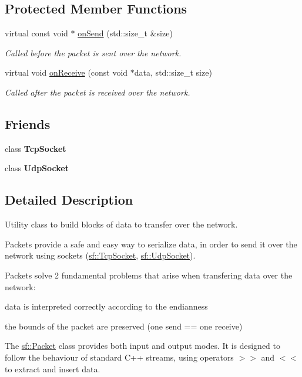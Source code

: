 \subsection*{Protected Member Functions}
\begin{DoxyCompactItemize}
\item 
virtual const void $\ast$ \hyperlink{classsf_1_1Packet_a052e955906c9bfd671622cb625380edc}{on\-Send} (std\-::size\-\_\-t \&size)
\begin{DoxyCompactList}\small\item\em Called before the packet is sent over the network. \end{DoxyCompactList}\item 
virtual void \hyperlink{classsf_1_1Packet_ab71a31ef0f1d5d856de6f9fc75434128}{on\-Receive} (const void $\ast$data, std\-::size\-\_\-t size)
\begin{DoxyCompactList}\small\item\em Called after the packet is received over the network. \end{DoxyCompactList}\end{DoxyCompactItemize}
\subsection*{Friends}
\begin{DoxyCompactItemize}
\item 
\hypertarget{classsf_1_1Packet_aa8b32310b01d4bb702d6bcb969d5f130}{class {\bfseries Tcp\-Socket}}\label{classsf_1_1Packet_aa8b32310b01d4bb702d6bcb969d5f130}

\item 
\hypertarget{classsf_1_1Packet_ae128c6687ced82c6157c5f865f8dec5c}{class {\bfseries Udp\-Socket}}\label{classsf_1_1Packet_ae128c6687ced82c6157c5f865f8dec5c}

\end{DoxyCompactItemize}


\subsection{Detailed Description}
Utility class to build blocks of data to transfer over the network. 

Packets provide a safe and easy way to serialize data, in order to send it over the network using sockets (\hyperlink{classsf_1_1TcpSocket}{sf\-::\-Tcp\-Socket}, \hyperlink{classsf_1_1UdpSocket}{sf\-::\-Udp\-Socket}).

Packets solve 2 fundamental problems that arise when transfering data over the network\-: \begin{DoxyItemize}
\item data is interpreted correctly according to the endianness \item the bounds of the packet are preserved (one send == one receive)\end{DoxyItemize}
The \hyperlink{classsf_1_1Packet}{sf\-::\-Packet} class provides both input and output modes. It is designed to follow the behaviour of standard C++ streams, using operators $>$$>$ and $<$$<$ to extract and insert data.

